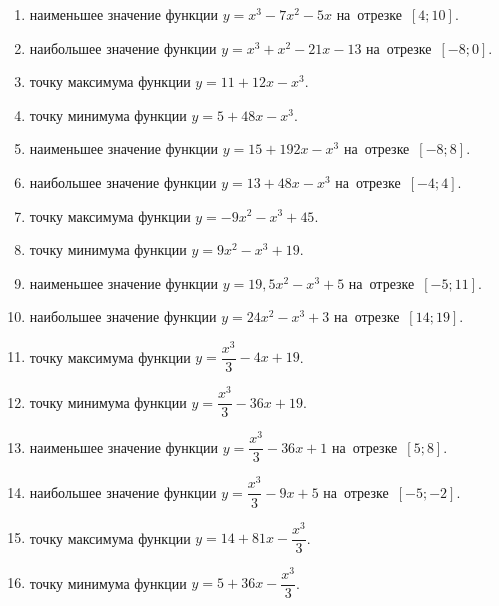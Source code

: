 \documentclass[a4paper,10pt]{article}
\begin{document}
\begin{enumerate}
\item {} наименьшее значение функции $y=x^3 -7x^2-5x$ на~отрезке~$\left[4;10\right]$.

\item {} наибольшее значение функции $y=x^3 +x^2-21x-13$ на~отрезке~$\left[-8;0\right]$.

\item {} точку максимума функции $y=11+12x-x^3$.

\item {} точку минимума функции $y=5+48x-x^3$.

\item {} наименьшее значение функции $y=15+192x-x^3$ на~отрезке~$\left[-8;8\right]$.

\item {} наибольшее значение функции $y=13+48x-x^3$ на~отрезке~$\left[-4;4\right]$.

\item {} точку максимума функции $y=-9x^2-x^3+45$.

\item {} точку минимума функции $y=9x^2-x^3+19$.

\item {} наименьшее значение функции $y=19,5x^2-x^3+5$ на~отрезке~$\left[-5;11\right]$.

\item {} наибольшее значение функции $y=24x^2-x^3+3$ на~отрезке~$\left[14;19\right]$.

\item {} точку максимума функции $y=\dfrac{x^3}{3} -4x+19$.

\item {} точку минимума функции $y=\dfrac{x^3}{3} -36x+19$.

\item {} наименьшее значение функции $y=\dfrac{x^3}{3} -36x+1$ на~отрезке~$\left[5;8\right]$.

\item {} наибольшее значение функции $y=\dfrac{x^3}{3} -9x+5$ на~отрезке~$\left[-5;-2\right]$.

\item {} точку максимума функции $y=14 +81x-\dfrac{x^3}{3}$.

\item {} точку минимума функции $y=5 +36x-\dfrac{x^3}{3}$.


\end{enumerate}
\end{document}
